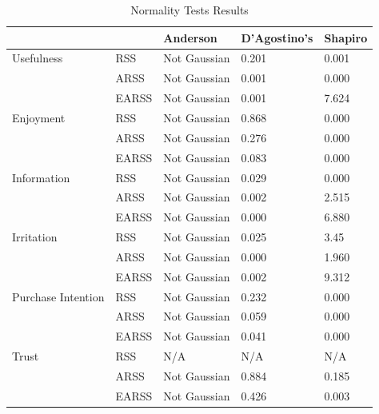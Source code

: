 \documentclass[letterpaper, 10 pt, conference]{ieeeconf}
\begin{document}
\begin{table}[h!]
\begin{tabular}{|l|l|l|l|l|}
\hline
                   &       & Anderson     & D'Agostino's & Shapiro \\ \hline
Usefulness         & RSS   & Not Gaussian & 0.201        & 0.001   \\ \hline
                   & ARSS  & Not Gaussian & 0.001        & 0.000   \\ \hline
                   & EARSS & Not Gaussian & 0.001        & 7.624   \\ \hline
Enjoyment          & RSS   & Not Gaussian & 0.868        & 0.000   \\ \hline
                   & ARSS  & Not Gaussian & 0.276        & 0.000   \\ \hline
                   & EARSS & Not Gaussian & 0.083        & 0.000   \\ \hline
Information        & RSS   & Not Gaussian & 0.029        & 0.000   \\ \hline
                   & ARSS  & Not Gaussian & 0.002        & 2.515   \\ \hline
                   & EARSS & Not Gaussian & 0.000        & 6.880   \\ \hline
Irritation         & RSS   & Not Gaussian & 0.025        & 3.45    \\ \hline
                   & ARSS  & Not Gaussian & 0.000        & 1.960   \\ \hline
                   & EARSS & Not Gaussian & 0.002        & 9.312   \\ \hline
Purchase Intention & RSS   & Not Gaussian & 0.232        & 0.000   \\ \hline
                   & ARSS  & Not Gaussian & 0.059        & 0.000   \\ \hline
                   & EARSS & Not Gaussian & 0.041        & 0.000   \\ \hline
Trust              & RSS   & N/A          & N/A          & N/A     \\ \hline
                   & ARSS  & Not Gaussian & 0.884        & 0.185   \\ \hline
                   & EARSS & Not Gaussian & 0.426        & 0.003   \\ \hline
\end{tabular}
\caption{\label{table}Normality Tests Results}
\end{table}
\end{document}

